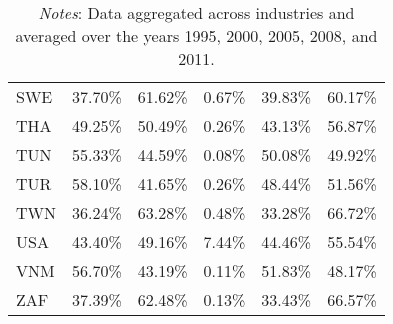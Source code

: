 \documentclass[a4paper,11pt]{article}
\begin{document}
\begin{table}[h]
\begin{tabular}{lrrrrr}
    SWE   & 37.70\% & 61.62\% & 0.67\% & 39.83\% & 60.17\% \\
    THA   & 49.25\% & 50.49\% & 0.26\% & 43.13\% & 56.87\% \\
    TUN   & 55.33\% & 44.59\% & 0.08\% & 50.08\% & 49.92\% \\
    TUR   & 58.10\% & 41.65\% & 0.26\% & 48.44\% & 51.56\% \\
    TWN   & 36.24\% & 63.28\% & 0.48\% & 33.28\% & 66.72\% \\
    USA   & 43.40\% & 49.16\% & 7.44\% & 44.46\% & 55.54\% \\
    VNM   & 56.70\% & 43.19\% & 0.11\% & 51.83\% & 48.17\% \\
    ZAF   & 37.39\% & 62.48\% & 0.13\% & 33.43\% & 66.57\% \\
     \bottomrule
 \end{tabular}
          \caption*{\textit{Notes}: Data aggregated across industries and averaged over the years 1995, 2000, 2005, 2008, and 2011.}
\end{table}
\end{document}

